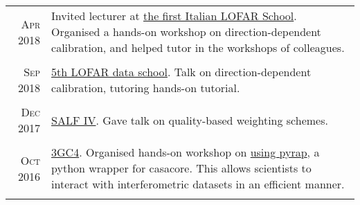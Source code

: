 \documentclass[11pt,a4paper,notitlepage]{article}
\begin{document}
\begin{tabular}{r|p{16.5cm}}
\textsc{Apr 2018} & Invited lecturer at \href{https://indico.ced.inaf.it/event/9/}{the first Italian LOFAR School}. Organised a hands-on workshop on direction-dependent calibration, and helped tutor in the workshops of colleagues.\\
\multicolumn{2}{c}{} \\

\textsc{Sep 2018} & \href{https://www.astron.nl/lofarschool2018/}{5th LOFAR data school}. Talk on direction-dependent calibration, tutoring hands-on tutorial.\\
\multicolumn{2}{c}{} \\

\textsc{Dec 2017} & \href{http://www.physics.usyd.edu.au/salf_iv/}{SALF IV}. Gave talk on quality-based weighting schemes.\\
\multicolumn{2}{c}{} \\

\textsc{Oct 2016} & \href{http://www.ast.uct.ac.za/ast/meetings-workshops/3gc4}{3GC4}. Organised hands-on workshop on \href{https://github.com/ebonnassieux/Teaching/blob/master/PyrapTutorial.ipynb}{using pyrap}, a python wrapper for casacore. This allows scientists to interact with interferometric datasets in an efficient manner.\\
\multicolumn{2}{c}{} \\
	
\end{tabular}


%
%
%		
%		

%
%
%
\end{document}
